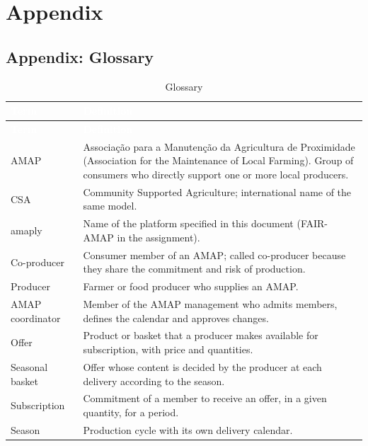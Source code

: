 \documentclass[11pt,a4paper]{article}
\begin{document}
\section{Appendix}


\subsection{Appendix: Glossary}

{\footnotesize
\begin{longtable}{>{\raggedright\arraybackslash\hspace{0pt}}p{}>{\raggedright\arraybackslash\hspace{0pt}}p{}}
\caption{Glossary}\\
\rowcolor{hdr}\textcolor{white}{\textbf{Term}} & \textcolor{white}{\textbf{Definition}} \\ \endfirsthead
\rowcolor{hdr}\textcolor{white}{\textbf{Term}} & \textcolor{white}{\textbf{Definition}} \\ \endhead
AMAP & Associação para a Manutenção da Agricultura de Proximidade (Association for the Maintenance of Local Farming). Group of consumers who directly support one or more local producers. \\ \hline
CSA & Community Supported Agriculture; international name of the same model. \\ \hline
amaply & Name of the platform specified in this document (FAIR-AMAP in the assignment). \\ \hline
Co-producer & Consumer member of an AMAP; called co-producer because they share the commitment and risk of production. \\ \hline
Producer & Farmer or food producer who supplies an AMAP. \\ \hline
AMAP coordinator & Member of the AMAP management who admits members, defines the calendar and approves changes. \\ \hline
Offer & Product or basket that a producer makes available for subscription, with price and quantities. \\ \hline
Seasonal basket & Offer whose content is decided by the producer at each delivery according to the season. \\ \hline
Subscription & Commitment of a member to receive an offer, in a given quantity, for a period. \\ \hline
Season & Production cycle with its own delivery calendar. \\ \hline

\end{longtable}}
\end{document}
